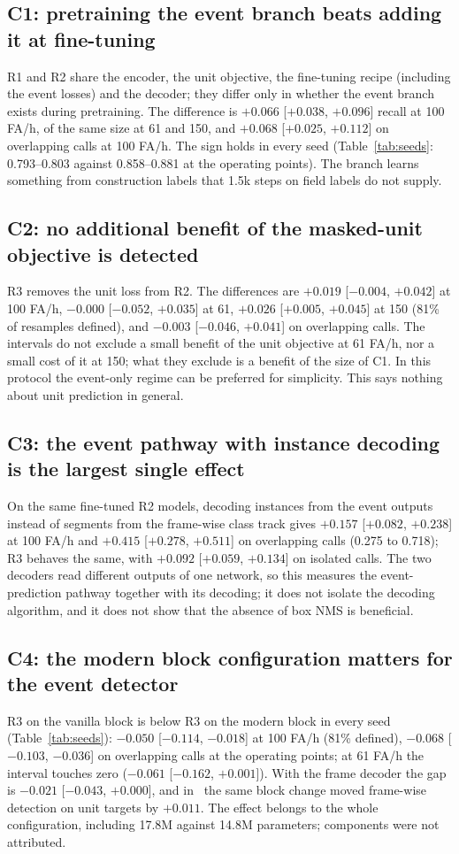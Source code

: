 \documentclass[10pt,twocolumn]{article}
\begin{document}
\subsection{C1: pretraining the event branch beats adding it at fine-tuning}
R1 and R2 share the encoder, the unit objective, the fine-tuning recipe (including the event losses) and the decoder; they differ only in whether the event branch exists during pretraining. The difference is $+0.066$ [$+0.038$, $+0.096$] recall at 100 FA/h, of the same size at 61 and 150, and $+0.068$ [$+0.025$, $+0.112$] on overlapping calls at 100 FA/h. The sign holds in every seed (Table~\ref{tab:seeds}: 0.793--0.803 against 0.858--0.881 at the operating points). The branch learns something from construction labels that 1.5k steps on field labels do not supply.

\subsection{C2: no additional benefit of the masked-unit objective is detected}
R3 removes the unit loss from R2. The differences are $+0.019$ [$-0.004$, $+0.042$] at 100 FA/h, $-0.000$ [$-0.052$, $+0.035$] at 61, $+0.026$ [$+0.005$, $+0.045$] at 150 (81\% of resamples defined), and $-0.003$ [$-0.046$, $+0.041$] on overlapping calls. The intervals do not exclude a small benefit of the unit objective at 61 FA/h, nor a small cost of it at 150; what they exclude is a benefit of the size of C1. In this protocol the event-only regime can be preferred for simplicity. This says nothing about unit prediction in general.

\subsection{C3: the event pathway with instance decoding is the largest single effect}
On the same fine-tuned R2 models, decoding instances from the event outputs instead of segments from the frame-wise class track gives $+0.157$ [$+0.082$, $+0.238$] at 100 FA/h and $+0.415$ [$+0.278$, $+0.511$] on overlapping calls (0.275 to 0.718); R3 behaves the same, with $+0.092$ [$+0.059$, $+0.134$] on isolated calls. The two decoders read different outputs of one network, so this measures the event-prediction pathway together with its decoding; it does not isolate the decoding algorithm, and it does not show that the absence of box NMS is beneficial.

\subsection{C4: the modern block configuration matters for the event detector}
R3 on the vanilla block is below R3 on the modern block in every seed (Table~\ref{tab:seeds}): $-0.050$ [$-0.114$, $-0.018$] at 100 FA/h (81\% defined), $-0.068$ [$-0.103$, $-0.036$] on overlapping calls at the operating points; at 61 FA/h the interval touches zero ($-0.061$ [$-0.162$, $+0.001$]). With the frame decoder the gap is $-0.021$ [$-0.043$, $+0.000$], and in~\citep{sheipak2026what} the same block change moved frame-wise detection on unit targets by $+0.011$. The effect belongs to the whole configuration, including 17.8M against 14.8M parameters; components were not attributed.
\end{document}
